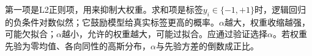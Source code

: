 第一项是L2正则项，用来抑制大权重。求和项是标签\(y_i\in\{-1,+1\}\)时，逻辑回归的负条件对数似然；它鼓励模型给真实标签更高的概率。\(\alpha\)越大，权重收缩越强，可能欠拟合；\(\alpha\)越小，允许的权重越大，可能过拟合。应通过验证选择\(\alpha\)。若权重先验为零均值、各向同性的高斯分布，\(\alpha\)与先验方差的倒数成正比。
